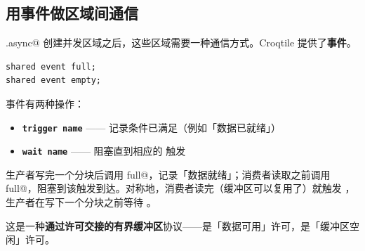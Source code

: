 \subsection*{用事件做区域间通信}

\co@inthreads.async@ 创建并发区域之后，这些区域需要一种通信方式。Croqtile 提供了\textbf{事件}。

\begin{lstlisting}[language=croqtile,caption={用事件做区域间通信}]
shared event full;
shared event empty;
\end{lstlisting}

事件有两种操作：

\begin{itemize}[leftmargin=1.6em]
\item \textbf{\texttt{trigger name}} —— 记录条件已满足（例如「数据已就绪」）
\item \textbf{\texttt{wait name}} —— 阻塞直到相应的 \co@trigger@ 触发
\end{itemize}

生产者写完一个分块后调用 \co@trigger full@，记录「数据就绪」；消费者读取之前调用 \co@wait full@，阻塞到该触发到达。对称地，消费者读完（缓冲区可以复用了）就触发 \co@empty@，生产者在写下一个分块之前等待 \co@empty@。

这是一种\textbf{通过许可交接的有界缓冲区}协议——\co@full@ 是「数据可用」许可，\co@empty@ 是「缓冲区空闲」许可。
